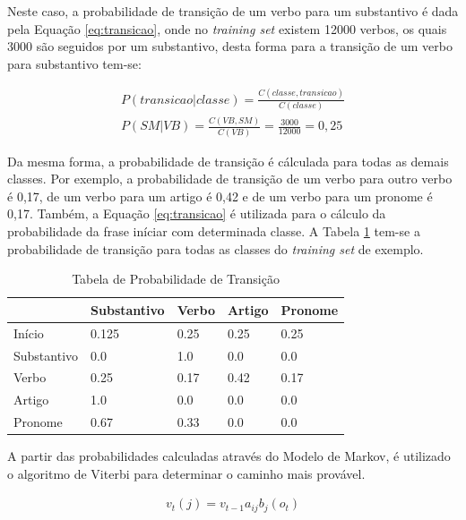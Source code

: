 Neste caso, a probabilidade de transição de um verbo para um substantivo é dada
pela Equação \ref{eq:transicao}, onde no \textit{training set} existem 12000
verbos, os quais 3000 são seguidos por um substantivo, desta forma para a
transição de um verbo para substantivo tem-se:

\begin{equation}
\begin{split}
P(transicao|classe) = \frac{C(classe,transicao)}{C(classe)} \\
P(SM|VB) = \frac{C(VB,SM)}{C(VB)} = \frac{3000}{12000} = 0,25
\end{split}
\label{eq:transicao}
\end{equation}

Da mesma forma, a probabilidade de transição é cálculada para todas as
demais classes. Por exemplo, a probabilidade de
transição de um verbo para outro verbo é 0,17, de um verbo para um artigo é 0,42
e de um verbo para um pronome é 0,17. Também, a Equação \ref{eq:transicao} é
utilizada para o cálculo da probabilidade da frase iníciar com determinada
classe.
A Tabela \ref{tabela:transicao} tem-se a probabilidade de transição para todas
as classes do \textit{training set} de exemplo.

\begin{table}[htb]
\centering
\begin{tabular}{|l|l|l|l|l|}
\hline
& Substantivo & Verbo & Artigo & Pronome \\ \hline
Início      & 0.125       & 0.25  & 0.25   & 0.25    \\ \hline
Substantivo & 0.0         & 1.0   & 0.0    & 0.0     \\ \hline
Verbo       & 0.25        & 0.17  & 0.42   & 0.17    \\ \hline
Artigo      & 1.0         & 0.0   & 0.0    & 0.0     \\ \hline
Pronome     & 0.67        & 0.33  & 0.0    & 0.0     \\ \hline
\end{tabular}
\caption{Tabela de Probabilidade de Transição}
\label{tabela:transicao}
\end{table}

A partir das probabilidades calculadas através do Modelo de Markov, é
utilizado o algoritmo de Viterbi para determinar o caminho mais provável.

\begin{equation}
\begin{split}
v_t(j) = v_{t-1} a_{ij} b_j(o_t)
\end{split}
\label{eq:viterbi}
\end{equation}

